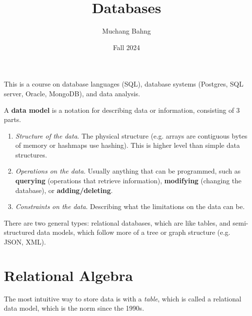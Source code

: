 \documentclass{article}
\begin{document}
\title{Databases}
\author{Muchang Bahng}
\date{Fall 2024}

\maketitle
\tableofcontents
\pagebreak 

  This is a course on database languages (SQL), database systems (Postgres, SQL server, Oracle, MongoDB), and data analysis. 

  \begin{definition}
    A \textbf{data model} is a notation for describing data or information, consisting of 3 parts. 
    \begin{enumerate}
      \item \textit{Structure of the data}. The physical structure (e.g. arrays are contiguous bytes of memory or hashmaps use hashing). This is higher level than simple data structures. 
      \item \textit{Operations on the data}. Usually anything that can be programmed, such as \textbf{querying} (operations that retrieve information), \textbf{modifying} (changing the database), or \textbf{adding/deleting}. 
      \item \textit{Constraints on the data}. Describing what the limitations on the data can be. 
    \end{enumerate}
  \end{definition}

  There are two general types: relational databases, which are like tables, and semi-structured data models, which follow more of a tree or graph structure (e.g. JSON, XML).  

\section{Relational Algebra}

  The most intuitive way to store data is with a \textit{table}, which is called a relational data model, which is the norm since the 1990s. 
\end{document}
